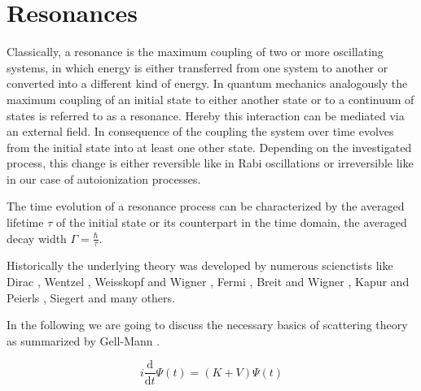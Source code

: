 \section{Resonances}

Classically, a resonance is the maximum coupling of two or more
oscillating systems, in which energy is either transferred from 
one system to another or converted into a different kind of energy.
In quantum mechanics analogously the maximum coupling of an initial 
state to either 
another state or to
a continuum of states is referred to as a resonance. Hereby this
interaction can be mediated via an external field.
In consequence of the coupling the system over time evolves from
the initial state into at least one other state. Depending on the investigated
process, this change is either reversible like in Rabi oscillations \cite{Rabi}
or irreversible like in our case of autoionization processes.

The time evolution of a resonance process can be characterized by
the averaged lifetime $\tau$ of the initial state or its counterpart
in the time domain,
the averaged decay width $\Gamma = \frac{\hbar}{\tau}$.

Historically the underlying theory was developed by numerous scienctists
like Dirac \cite{Dirac27_1,Dirac27_2}, Wentzel \cite{Wentzel27}, 
Weisskopf and Wigner \cite{Weisskopf30},
Fermi \cite{Fermi32}, Breit and Wigner \cite{Breit36},
Kapur and Peierls \cite{Kapur38}, Siegert \cite{Siegert39} and many others.

In the following we are going to discuss the necessary basics of scattering
theory as summarized by Gell-Mann \cite{Gell-Mann53}.




\begin{equation}
  i \frac{\mathrm{d}}{\mathrm{d}t} \Psi(t) = (K + V) \Psi(t)
\end{equation}

